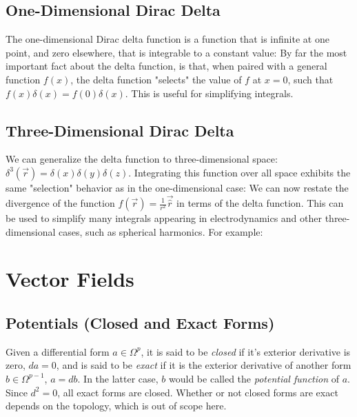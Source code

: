 \subsection{One-Dimensional Dirac Delta}
The one-dimensional Dirac delta function is a function that is infinite at one point, and zero elsewhere, that is integrable to a constant value:
By far the most important fact about the delta function, is that, when paired with a general function $f(x)$, the delta function "selects" the value of $f$ at $x=0$, such that $f(x)\delta(x) = f(0)\delta(x)$. This is useful for simplifying integrals. 
\subsection{Three-Dimensional Dirac Delta}
We can generalize the delta function to three-dimensional space: $\delta^3(\vec{r})=\delta(x)\delta(y)\delta(z)$. Integrating this function over all space exhibits the same "selection" behavior as in the one-dimensional case:
We can now restate the divergence of the function $f(\vec{r})=\frac{1}{r^2}\vec{\hat{r}}$ in terms of the delta function. 
This can be used to simplify many integrals appearing in electrodynamics and other three-dimensional cases, such as spherical harmonics. For example:


\newpage
\section{Vector Fields}
\subsection{Potentials (Closed and Exact Forms)}
Given a differential form $a\in \Omega^p$, it is said to be \textit{closed} if it's exterior derivative is zero, $da=0$, and is said to be \textit{exact} if it is the exterior derivative of another form $b \in \Omega^{p-1}$, $a = db$. In the latter case, $b$ would be called the \textit{potential function} of $a$. Since $d^2=0$, all exact forms are closed. Whether or not closed forms are exact depends on the topology, which is out of scope here. 

